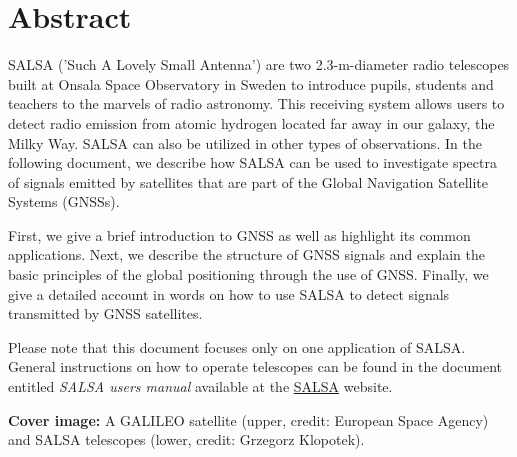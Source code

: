 \chapter*{Abstract}
SALSA ('Such A Lovely Small Antenna') are two 2.3-m-diameter radio
telescopes built at Onsala Space Observatory in Sweden to introduce pupils,
students and teachers to the marvels of radio astronomy. This receiving system allows users to detect 
radio emission from atomic hydrogen located far away in our galaxy, the Milky Way. 
SALSA can also be utilized in other types of observations. In the following document, we describe how SALSA can 
be used to investigate spectra of signals emitted by satellites that are part of the Global Navigation Satellite Systems (GNSSs).\par{}

First, we give a brief introduction to GNSS as well as highlight its common applications. 
Next, we describe the structure of GNSS signals and explain the basic principles of the global positioning through the use of GNSS. 
Finally, we give a detailed account in words on how to use SALSA to detect signals transmitted by GNSS satellites. \par{}
Please note that this document focuses only on one application of SALSA. General instructions on how to operate telescopes
can be found in the document entitled \emph{SALSA users manual} available at the 
\href{https://vale.oso.chalmers.se/salsa/support}{SALSA} website.


\vspace{9cm}




{\bf Cover image:} A GALILEO satellite (upper, credit: European Space Agency) and SALSA telescopes (lower, credit: Grzegorz Klopotek).

